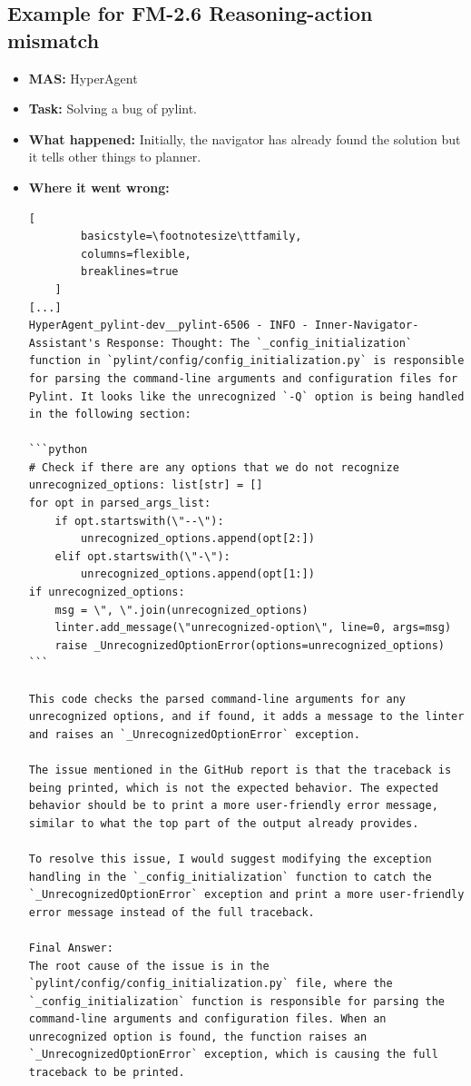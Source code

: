 \subsection{Example for FM-2.6 Reasoning-action mismatch}\label{ex:fm1.2}
\begin{itemize}
    \item \textbf{MAS:} HyperAgent 
    \item \textbf{Task:} Solving a bug of pylint. 
    \item \textbf{What happened:} Initially, the navigator has already found the solution but it tells other things to planner. 
    \item \textbf{Where it went wrong:} 
    \begin{lstlisting}[
        basicstyle=\footnotesize\ttfamily,
        columns=flexible,
        breaklines=true
    ]
[...]
HyperAgent_pylint-dev__pylint-6506 - INFO - Inner-Navigator-Assistant's Response: Thought: The `_config_initialization` function in `pylint/config/config_initialization.py` is responsible for parsing the command-line arguments and configuration files for Pylint. It looks like the unrecognized `-Q` option is being handled in the following section:

```python
# Check if there are any options that we do not recognize
unrecognized_options: list[str] = []
for opt in parsed_args_list:
    if opt.startswith(\"--\"):
        unrecognized_options.append(opt[2:])
    elif opt.startswith(\"-\"):
        unrecognized_options.append(opt[1:])
if unrecognized_options:
    msg = \", \".join(unrecognized_options)
    linter.add_message(\"unrecognized-option\", line=0, args=msg)
    raise _UnrecognizedOptionError(options=unrecognized_options)
```

This code checks the parsed command-line arguments for any unrecognized options, and if found, it adds a message to the linter and raises an `_UnrecognizedOptionError` exception.

The issue mentioned in the GitHub report is that the traceback is being printed, which is not the expected behavior. The expected behavior should be to print a more user-friendly error message, similar to what the top part of the output already provides.

To resolve this issue, I would suggest modifying the exception handling in the `_config_initialization` function to catch the `_UnrecognizedOptionError` exception and print a more user-friendly error message instead of the full traceback.

Final Answer:
The root cause of the issue is in the `pylint/config/config_initialization.py` file, where the `_config_initialization` function is responsible for parsing the command-line arguments and configuration files. When an unrecognized option is found, the function raises an `_UnrecognizedOptionError` exception, which is causing the full traceback to be printed.


\end{lstlisting}
\end{itemize}
